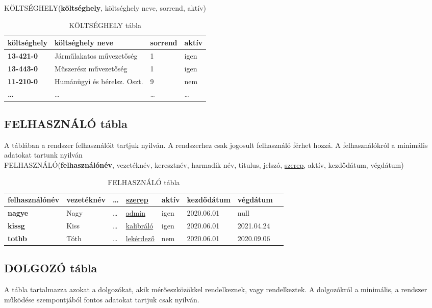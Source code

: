 \documentclass[a4paper,12pt]{report}
\newcommand{\pk}[1]{\textbf{#1}} %
\newcommand{\fk}[1]{\underline{#1}} %
\newcommand{\tabla}[1]{\noindent\MakeUppercase{#1}} %
\begin{document}
\tabla{KÖLTSÉGHELY}(\pk{költséghely}, költséghely neve, sorrend, aktív)


\begin{table}[ht!]
\centering
	\begin{footnotesize}
\begin{tabular}[t]{|l|l|l|l|}
\hline
 \textbf{költséghely}&költséghely neve&sorrend&aktív\\ \hline
 \textbf{13-421-0}&Járműlakatos művezetőség&1&igen\\
 \textbf{13-443-0}&Műszerész művezetőség&1&igen\\
 \textbf{11-210-0}&Humánügyi és bérelsz. Oszt.&9&nem\\
 \textbf{\dots}&\dots&\dots&\dots \\
\end{tabular}
\end{footnotesize}
\caption{KÖLTSÉGHELY tábla} \label{tabKOLTSEGHELY}
\end{table}


\subsection{FELHASZNÁLÓ tábla}
A táblában a rendszer felhasználóit tartjuk nyilván. A rendszerhez csak 
jogosult felhasználó férhet hozzá. A felhasználókról a minimális adatokat 
tartunk nyilván\\

\tabla{felhasználó}(\pk{felhasználónév}, vezetéknév, keresztnév, 
harmadik név, titulus, jelszó, \fk{szerep}, aktív, kezdődátum, végdátum)


\begin{table}[ht!]
 \centering
 \begin{footnotesize}
 \begin{tabular}[t]{|l|l|l|l|l|l|l|l|}
  \hline
\textbf{felhasználónév}&vezetéknév&\dots&\fk{szerep}
&aktív&kezdődátum&végdátum\\ \hline
  \textbf{nagye}&Nagy&\dots&\fk{admin}&igen&2020.06.01&null \\
  \textbf{kissg}&Kiss&\dots&\fk{kalibráló}&igen&2020.06.01&2021.04.24\\
  \textbf{tothb}&Tóth&\dots&\fk{lekérdező}&nem&2020.06.01&2020.09.06\\
 \end{tabular}
\end{footnotesize}
\caption{FELHASZNÁLÓ tábla}\label{tabFEHASZNALO}
\end{table}


\subsection{DOLGOZÓ tábla}
A tábla tartalmazza azokat a dolgozókat, akik mérőeszközökkel 
rendelkeznek, vagy rendelkeztek. A dolgozókról a minimális, a rendszer 
működése szempontjából fontos adatokat tartjuk csak nyilván.\\
\end{document}
